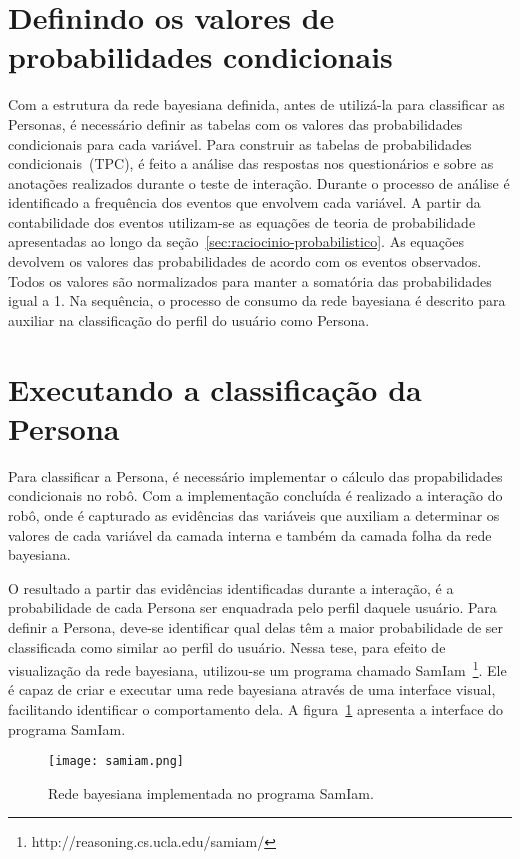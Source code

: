 \section{Definindo os valores de probabilidades condicionais}
\label{sec:tpc}
Com a estrutura da rede bayesiana definida, antes de utilizá-la para classificar as Personas, é necessário definir as tabelas com os valores das probabilidades condicionais para cada variável. Para construir as tabelas de probabilidades condicionais~(TPC), é feito a análise das respostas nos questionários e sobre as anotações realizados durante o teste de interação. Durante o processo de análise é identificado a frequência dos eventos que envolvem cada variável. A partir da contabilidade dos eventos utilizam-se as equações de teoria de probabilidade apresentadas ao longo da seção~\ref{sec:raciocinio-probabilistico}. As equações devolvem os valores das probabilidades de acordo com os eventos observados. Todos os valores são normalizados para manter a somatória das probabilidades igual a 1. Na sequência, o processo de consumo da rede bayesiana é descrito para auxiliar na classificação do perfil do usuário como Persona.

\section{Executando a classificação da Persona}
\label{sec:consumo}
Para classificar a Persona, é necessário implementar o cálculo das propabilidades condicionais no robô. Com a implementação concluída é realizado a interação do robô, onde é capturado as evidências das variáveis que auxiliam a determinar os valores de cada variável da camada interna e também da camada folha da rede bayesiana.

O resultado a partir das evidências identificadas durante a interação, é a probabilidade de cada Persona ser enquadrada pelo perfil daquele usuário. Para definir a Persona, deve-se identificar qual delas têm a maior probabilidade de ser classificada como similar ao perfil do usuário. Nessa tese, para efeito de visualização da rede bayesiana, utilizou-se um programa chamado SamIam~\footnote{http://reasoning.cs.ucla.edu/samiam/}. Ele é capaz de criar e executar uma rede bayesiana através de uma interface visual, facilitando identificar o comportamento dela. A figura~\ref{fig:samiam} apresenta a interface do programa SamIam.

\begin{figure}[ht!]
	\centering
	\begin{minipage}{\textwidth}
		\caption{Rede bayesiana implementada no programa SamIam.}
		\texttt{[image: samiam.png]}
		\label{fig:samiam}
	\end{minipage}
\end{figure}


